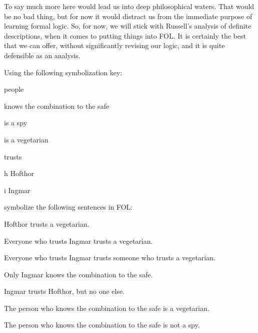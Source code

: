 To say much more here would lead us into deep philosophical waters. That would be no bad thing, but for now it would distract us from the immediate purpose of learning formal logic. So, for now, we will stick with Russell's analysis of definite descriptions, when it comes to putting things into FOL. It is certainly the best that we can offer, without significantly revising our logic, and it is quite defensible as an analysis.

\practiceproblems

\problempart
Using the following symbolization key:
\begin{ekey}
\item[\text{domain}] people
\item[\atom{K}{x}]  knows the combination to the safe
\item[\atom{S}{x}]  is a spy
\item[\atom{V}{x}]  is a vegetarian
\item[\atom{T}{x,y}]  trusts 
\item[h] Hofthor
\item[i] Ingmar
\end{ekey}
symbolize the following sentences in FOL:
\begin{earg}
\item Hofthor trusts a vegetarian.
\item Everyone who trusts Ingmar trusts a vegetarian.
\item Everyone who trusts Ingmar trusts someone who trusts a vegetarian.
\item Only Ingmar knows the combination to the safe.
\item Ingmar trusts Hofthor, but no one else.
\item The person who knows the combination to the safe is a vegetarian.
\item The person who knows the combination to the safe is not a spy.
\end{earg}


